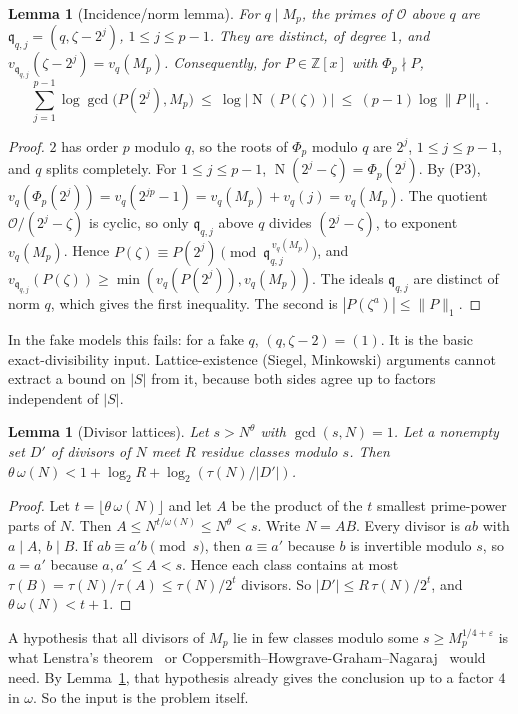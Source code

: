 \documentclass[11pt]{amsart}
\newtheorem{lemma}[theorem]{Lemma}
\theoremstyle{definition}
\theoremstyle{remark}
\newcommand{\cO}{\mathcal{O}}
\newcommand{\Z}{\mathbb{Z}}
\DeclareMathOperator{\Nm}{N}
\begin{document}
\begin{lemma}[Incidence/norm lemma]\label{lem:incidence}
For $q\mid M_p$, the primes of $\cO$ above $q$ are $\mathfrak q_{q,j}=(q,\zeta-2^j)$, $1\le j\le p-1$. They are
distinct, of degree $1$, and $v_{\mathfrak q_{q,j}}(\zeta-2^j)=v_q(M_p)$. Consequently, for $P\in\Z[x]$ with
$\Phi_p\nmid P$,
\[
\sum_{j=1}^{p-1}\log\gcd\bigl(P(2^j),M_p\bigr)\ \le\ \log|\Nm(P(\zeta))|\ \le\ (p-1)\log\|P\|_1 .
\]
\end{lemma}
\begin{proof}
$2$ has order $p$ modulo $q$, so the roots of $\Phi_p$ modulo $q$ are $2^j$, $1\le j\le p-1$, and $q$ splits completely.
For $1\le j\le p-1$, $\Nm(2^j-\zeta)=\Phi_p(2^j)$. By (P3), $v_q(\Phi_p(2^j))=v_q(2^{jp}-1)=v_q(M_p)+v_q(j)=v_q(M_p)$.
The quotient $\cO/(2^j-\zeta)$ is cyclic, so only $\mathfrak q_{q,j}$ above $q$ divides $(2^j-\zeta)$, to exponent
$v_q(M_p)$. Hence $P(\zeta)\equiv P(2^j)\pmod{\mathfrak q_{q,j}^{\,v_q(M_p)}}$, and
$v_{\mathfrak q_{q,j}}(P(\zeta))\ge\min(v_q(P(2^j)),v_q(M_p))$. The ideals $\mathfrak q_{q,j}$ are distinct of norm
$q$, which gives the first inequality. The second is $|P(\zeta^a)|\le\|P\|_1$.
\end{proof}
In the fake models this fails: for a fake $q$, $(q,\zeta-2)=(1)$. It is the basic exact-divisibility input.
Lattice-existence (Siegel, Minkowski) arguments cannot extract a bound on $|S|$ from it, because both sides agree up to
factors independent of $|S|$.

\begin{lemma}[Divisor lattices]\label{lem:O}
Let $s>N^\theta$ with $\gcd(s,N)=1$. Let a nonempty set $D'$ of divisors of $N$ meet $R$ residue classes modulo $s$.
Then $\theta\,\omega(N)<1+\log_2R+\log_2(\tau(N)/|D'|)$.
\end{lemma}
\begin{proof}
Let $t=\lfloor\theta\,\omega(N)\rfloor$ and let $A$ be the product of the $t$ smallest prime-power parts of $N$. Then
$A\le N^{t/\omega(N)}\le N^\theta<s$. Write $N=AB$. Every divisor is $ab$ with $a\mid A$, $b\mid B$. If $ab\equiv a'b\pmod s$,
then $a\equiv a'$ because $b$ is invertible modulo $s$, so $a=a'$ because $a,a'\le A<s$. Hence each class contains at most
$\tau(B)=\tau(N)/\tau(A)\le\tau(N)/2^t$ divisors. So $|D'|\le R\,\tau(N)/2^t$, and $\theta\,\omega(N)<t+1$.
\end{proof}

A hypothesis that all divisors of $M_p$ lie in few classes modulo some $s\ge M_p^{1/4+\varepsilon}$ is what Lenstra's
theorem~\cite{Le84} or Coppersmith--Howgrave-Graham--Nagaraj~\cite{CHN08} would need. By Lemma~\ref{lem:O}, that
hypothesis already gives the conclusion up to a factor $4$ in $\omega$. So the input is the problem itself.
\end{document}
